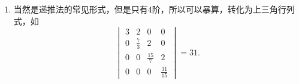 \begin{exercise}
\begin{exgroup}
\begin{answer}
\begin{enumerate}
                \item 当然是递推法的常见形式，但是只有4阶，所以可以暴算，转化为上三角行列式，如\[
                          \begin{vmatrix}
                              3 & 2           & 0            & 0             \\
                              0 & \frac{7}{3} & 2            & 0             \\
                              0 & 0           & \frac{15}{7} & 2             \\
                              0 & 0           & 0            & \frac{31}{15}
                          \end{vmatrix}=31.\]
            \end{enumerate}
        \end{answer}


\end{exgroup}
\end{exercise}
